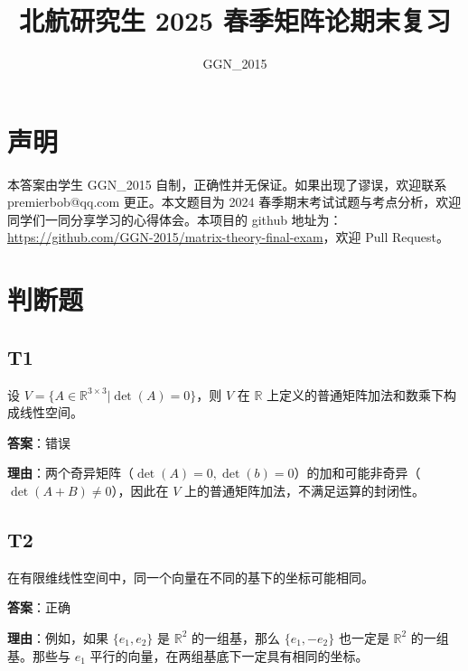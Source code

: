 \documentclass{article}
\title{北航研究生 2025 春季矩阵论期末复习}
\author{GGN\_2015}
\date{}
\begin{document}
\maketitle

\section{声明}

本答案由学生 GGN\_2015 自制，正确性并无保证。如果出现了谬误，欢迎联系 premierbob@qq.com 更正。本文题目为 2024 春季期末考试试题与考点分析，欢迎同学们一同分享学习的心得体会。本项目的 github 地址为：\href{https://github.com/GGN-2015/matrix-theory-final-exam}{https://github.com/GGN-2015/matrix-theory-final-exam}，欢迎 Pull Request。

\newpage

\tableofcontents

\newpage

\section{判断题}

\subsection{T1}

\par 设 \(V=\{A\in \mathbb R^{3\times 3}| \det(A) = 0\}\)，则 $V$ 在 $\mathbb R$ 上定义的普通矩阵加法和数乘下构成线性空间。

\par \textbf{答案}：错误

\par \textbf{理由}：两个奇异矩阵（$\det(A)=0, \det(b)=0$）的加和可能非奇异（$\det(A+B)\neq 0$），因此在 $V$ 上的普通矩阵加法，不满足运算的封闭性。

\subsection{T2}

\par 在有限维线性空间中，同一个向量在不同的基下的坐标可能相同。

\par \textbf{答案}：正确

\par \textbf{理由}：例如，如果 $\{e_1, e_2\}$ 是 $\mathbb R^2$ 的一组基，那么 \(\{e_1, -e_2\}\) 也一定是 $\mathbb R^2$ 的一组基。那些与 $e_1$ 平行的向量，在两组基底下一定具有相同的坐标。
\end{document}
